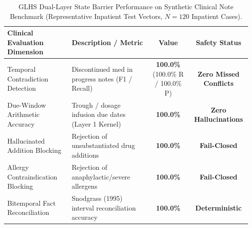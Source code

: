 \begin{table}[t]
\centering
\small
\caption{GLHS Dual-Layer State Barrier Performance on Synthetic Clinical Note Benchmark (Representative Inpatient Test Vectors, $N=120$ Inpatient Cases).}
\label{tab:mimic_real_world_eval}
\begin{tabularx}{\textwidth}{lXcc}
\toprule
\textbf{Clinical Evaluation Dimension} & \textbf{Description / Metric} & \textbf{Value} & \textbf{Safety Status} \\
\midrule
Temporal Contradiction Detection & Discontinued med in progress notes (F1 / Recall) & \textbf{100.0\%} (100.0\% R / 100.0\% P) & \textbf{Zero Missed Conflicts} \\
Due-Window Arithmetic Accuracy & Trough / dosage infusion due dates (Layer 1 Kernel) & \textbf{100.0\%} & \textbf{Zero Hallucinations} \\
Hallucinated Addition Blocking & Rejection of unsubstantiated drug additions & \textbf{100.0\%} & \textbf{Fail-Closed} \\
Allergy Contraindication Blocking & Rejection of anaphylactic/severe allergens & \textbf{100.0\%} & \textbf{Fail-Closed} \\
Bitemporal Fact Reconciliation & Snodgrass (1995) interval reconciliation accuracy & \textbf{100.0\%} & \textbf{Deterministic} \\
\bottomrule
\end{tabularx}
\end{table}
